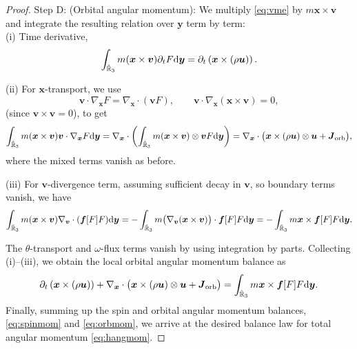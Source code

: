 \documentclass[a4paper,11pt]{article}
\numberwithin{equation}{section}
\theoremstyle{definition}
\newcommand{\bfs}[1]{{\boldsymbol #1}}
\newcommand{\bfx}{\boldsymbol{x}}
\newcommand{\bfy}{\boldsymbol{y}}
\newcommand{\bfv}{\boldsymbol{v}}
\newcommand{\bfuu}{\boldsymbol{u}}
\newcommand{\bff}{\boldsymbol{f}}
\newcommand{\bbr}{\mathbb R}
\def\d{{  \rm d}}
\begin{document}
\begin{proof}
\noindent Step D: (Orbital angular momentum):
We multiply \eqref{eq:vme} by $m\bfx\times\bfv$ and integrate the resulting relation over $\bfy$ term by term: \\
\noindent (i) Time derivative,
\[
\int_{\hat{\bbr}_3} m(\bfx\times\bfv) \partial_t F \d\bfy
= \partial_t \left(\bfx\times(\rho\bfuu)\right).
\]

\noindent (ii) For $\bfx$-transport, we use
\[
\bfv\cdot\nabla_{\bfx}F=\nabla_{\bfx}\cdot(\bfv F),\qquad \bfv\cdot\nabla_{\bfx}(\bfx\times\bfv)=0,
\]
(since $\bfv\times\bfv=0$), to get
\[
\int_{\hat{\bbr}_3} m(\bfx\times\bfv) \bfv\cdot\nabla_{\bfx}F \d\bfy
=
\nabla_{\bfx}\cdot\left(\int_{\hat{\bbr}_3} m(\bfx\times\bfv)\otimes\bfv F \d\bfy\right) 
= \nabla_{\bfx}\cdot \big( \bfx\times (\rho\bfuu) \otimes\bfuu + \bfs{J}_{\rm orb}\big),
\]
where the mixed terms vanish as before. 

\vspace{0.1cm}
\noindent (iii) For $\bfv$-divergence term,
assuming sufficient decay in $\bfv$, so boundary terms vanish, we have
\[
\int_{\hat{\bbr}_3} m(\bfx\times\bfv) \nabla_{\bfv}\cdot(\bff[F]F) \d\bfy
=
-\int_{\hat{\bbr}_3} m \big(\nabla_{\bfv}(\bfx\times\bfv)\big) \cdot \bff[F]F \d\bfy
=
-\int_{\hat{\bbr}_3} m \bfx\times\bff[F] F \d\bfy.
\]

The $\theta$-transport and $\omega$-flux terms vanish by using integration by parts. Collecting (i)--(iii), we obtain the local orbital angular momentum balance as
\begin{equation}\label{eq:orbmom}
\partial_t \left(\bfx\times(\rho\bfuu)\right)
+
\nabla_{\bfx}\cdot \big( \bfx\times (\rho\bfuu) \otimes \bfuu + \bfs{J}_{\rm orb}\big)
=
\int_{\hat{\bbr}_3} m \bfx\times\bff[F] F \d\bfy.
\end{equation}
%
Finally, summing up the spin and orbital angular momentum balances, \eqref{eq:spinmom} and \eqref{eq:orbmom}, we arrive at the desired balance law for total angular momentum \eqref{eq:hangmom}. 




\end{proof}
\end{document}
